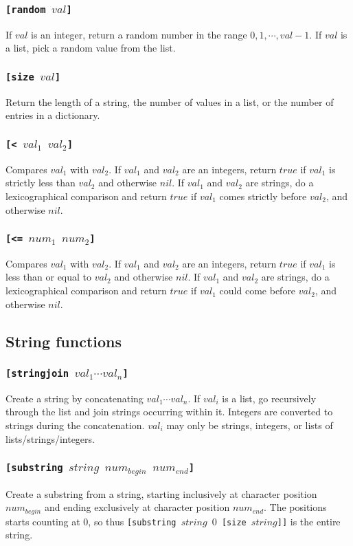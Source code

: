 \subsubsection{\tt{[random }$val$\tt{]}}
If $val$ is an integer, return a random number in the range $0,1, \cdots, val -1$. If $val$ is a list, pick a random value from the list.
\subsubsection{\tt{[size }$val$\tt{]}}
Return the length of a string, the number of values in a list, or the number of entries in a dictionary.
\subsubsection{\tt{[< }$val_1$ $val_2$\tt{]}}
Compares $val_1$ with $val_2$. If $val_1$ and $val_2$ are an integers, return $true$ if $val_1$ is strictly less than $val_2$ and otherwise $nil$.
If $val_1$ and $val_2$ are strings, do a lexicographical comparison and return $true$ if $val_1$ comes strictly before $val_2$, and otherwise $nil$.
\subsubsection{\tt{[<= }$num_1$ $num_2$\tt{]}}
Compares $val_1$ with $val_2$. If $val_1$ and $val_2$ are an integers, return $true$ if $val_1$ is less than or equal to $val_2$ and otherwise $nil$.
If $val_1$ and $val_2$ are strings, do a lexicographical comparison and return $true$ if $val_1$ could come before $val_2$, and otherwise $nil$.

\subsection{String functions}
\subsubsection{\tt{[stringjoin }$val_1\cdots val_n$\tt{]}}
Create a string by concatenating $val_1\cdots val_n$.
If $val_i$ is a list, go recursively through the list and join strings occurring within it. Integers are converted to strings during the concatenation. $val_i$ may only be strings, integers, or lists of lists/strings/integers.
\subsubsection{\tt{[substring }$string$ $num_{begin}$ $num_{end}$\tt{]}}
Create a substring from a string, starting inclusively at character position $num_{begin}$ and ending exclusively at character position $num_{end}$. The positions starts counting at $0$, so thus {\tt{[substring }$string$ $0$ \tt{[size }$string$\tt{]]}} is the entire string.

